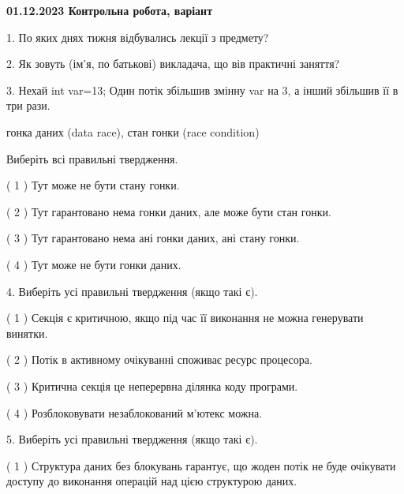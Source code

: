 \documentclass[12pt, ukrainian]{article}
\begin{document}
\vspace{4mm}
\newpage
\begin {large}

\textbf{01.12.2023 Контрольна робота, варіант  }\par


{
1. По яких днях тижня відбувались лекції з предмету?



\vspace{5mm}
2. Як зовуть (ім'я, по батькові) викладача, що вів практичні заняття?



\vspace{5mm}
3. Нехай int var=13; Один потік збільшив змінну var на 3, а інший збільшив її в три рази.

гонка даних (data race), стан гонки (race condition)

Виберіть всі правильні твердження.\par
\vspace{2mm}
( 1 ) Тут може не бути стану гонки.%

( 2 ) Тут гарантовано нема гонки даних, але може бути стан гонки.%

( 3 ) Тут гарантовано нема ані гонки даних, ані стану гонки.%

( 4 ) Тут може не бути гонки даних.%


\vspace{5mm}
4. Виберіть усі правильні твердження (якщо такі є).\par
\vspace{2mm}

( 1 ) Секція є критичною, якщо під час її виконання не можна генерувати винятки.%

( 2 ) Потік в активному очікуванні споживає ресурс процесора.%

( 3 ) Критична секція це неперервна ділянка коду програми.%

( 4 ) Розблоковувати незаблокований м’ютекс можна.%


\vspace{5mm}
5. Виберіть усі правильні твердження (якщо такі є).\par
\vspace{2mm}

( 1 ) Структура даних без блокувань гарантує, що жоден потік не буде очікувати доступу до виконання операцій над цією структурою даних.%

}
\end{large}
\end{document}
